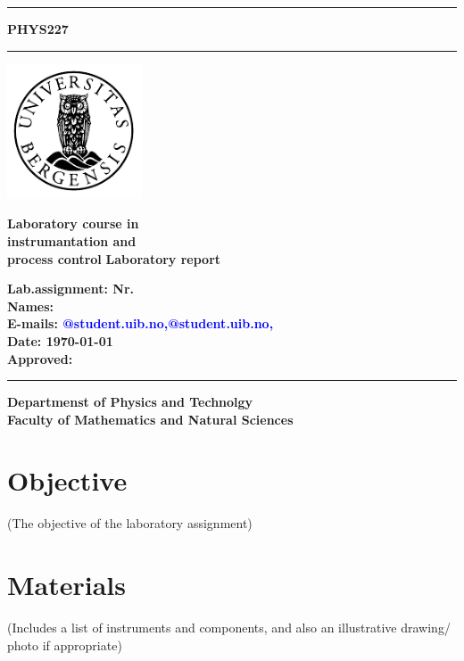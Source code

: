 \documentclass[12pt]{article}
\renewcommand{\maketitle}{}
\begin{document}
\maketitle
\newcommand{\blankpage}{\newpage{}\thispagestyle{empty}\mbox{}\newpage{}}
\newcommand{\HRule}{\rule{\linewidth}{0.5mm}}

\begin{titlepage}

\hrule height 0.1cm
\vskip 1cm 
\textbf{\fontsize{40}{48} \selectfont PHYS227}
\vskip 1cm 
\hrule height 0.1cm
\hfill\includegraphics[width=4cm]{uib-emblem-svart} 

\textbf {\fontsize{40}{48} \selectfont Laboratory course in \\instrumantation and \\process control}\vskip 1cm 
\centering 
\textbf  {\fontsize{20}{24} \selectfont Laboratory report}\vskip 1cm
\justify
    
\textbf
{Lab.assignment:   Nr.
\\Names:  
\\ E-mails: \textcolor{blue}{@student.uib.no,@student.uib.no,}
\\ Date:   {\today}
\\ Approved:
}\vskip 2cm 

\hrule height 0.1cm
\vskip 0.3cm 
\textbf {\large Departmenst of Physics and Technolgy
        \\Faculty of Mathematics and Natural Sciences}

\end{titlepage}




\setlength{\parskip}{0.2in}



\section{Objective}
(The objective of the laboratory assignment)
 

 

\section{Materials}
(Includes a list of instruments and components, and also an illustrative drawing/ photo if appropriate)
\end{document}
